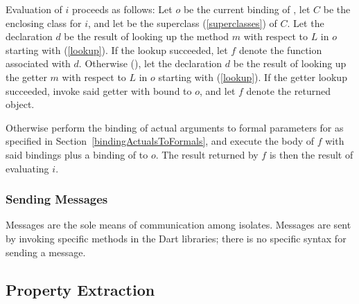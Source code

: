\documentclass[makeidx]{article}
\begin{document}
{{

\LMHash{}%
Evaluation of $i$ proceeds as follows:
Let $o$ be the current binding of \THIS{},
let $C$ be the enclosing class for $i$,
and let \SuperClass{} be the superclass (\ref{superclasses}) of $C$.
Let the declaration $d$ be the result of looking up
the method $m$ with respect to $L$ in $o$ starting with \SuperClass{}
(\ref{lookup}).
If the lookup succeeded,
let $f$ denote the function associated with $d$.
%
Otherwise (),
let the declaration $d$ be the result of looking up
the getter $m$ with respect to $L$ in $o$ starting with \SuperClass{}
(\ref{lookup}).
If the getter lookup succeeded,
invoke said getter with \THIS{} bound to $o$,
and let $f$ denote the returned object.


\LMHash{}%
Otherwise perform the binding of actual arguments to formal parameters for
as specified in Section~\ref{bindingActualsToFormals},
and execute the body of $f$ with said bindings
plus a binding of \THIS{} to $o$.
The result returned by $f$ is then the result of evaluating $i$.

} %


\subsubsection{Sending Messages}

\LMHash{}%
Messages are the sole means of communication among isolates.
Messages are sent by invoking specific methods in the Dart libraries; there is no specific syntax for sending a message.



\subsection{Property Extraction}

}
\end{document}
